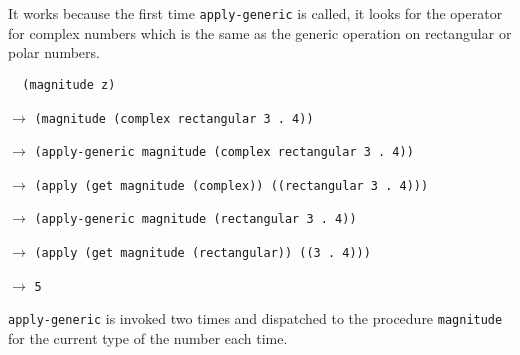 \documentclass[a4paper,12pt]{article}
\begin{document}
It works because the first time \lstinline!apply-generic! is called,
it looks for the operator for complex numbers which is the same as the
generic operation on rectangular or polar numbers.

\begin{lstlisting}
  (magnitude z)
\end{lstlisting}

$\rightarrow$ \lstinline!(magnitude (complex rectangular 3 . 4))!

$\rightarrow$
\lstinline!(apply-generic magnitude (complex rectangular 3 . 4))!

$\rightarrow$
\lstinline!(apply (get magnitude (complex)) ((rectangular 3 . 4)))!

$\rightarrow$
\lstinline!(apply-generic magnitude (rectangular 3 . 4))!

$\rightarrow$
\lstinline!(apply (get magnitude (rectangular)) ((3 . 4)))!

$\rightarrow$ \lstinline!5!

\lstinline!apply-generic! is invoked two times and dispatched to the
procedure \lstinline!magnitude! for the current type of the number
each time.
\end{document}
